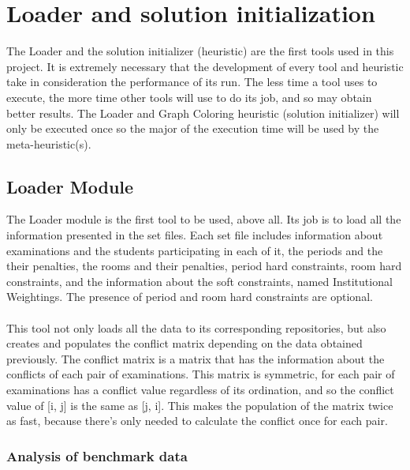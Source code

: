 \chapter{Loader and solution initialization}
\label{implementation}
\thispagestyle{plain}

The Loader and the solution initializer (heuristic) are the first tools used in this project. It is extremely necessary that the development of every tool and heuristic take in consideration the performance of its run. The less time a tool uses to execute, the more time other tools will use to do its job, and so may obtain better results. The Loader and Graph Coloring heuristic (solution initializer) will only be executed once so the major of the execution time will be used by the meta-heuristic(s).

\section{Loader Module}

The Loader module is the first tool to be used, above all. Its job is to load all the information presented in the set files. Each set file includes information about examinations and the students participating in each of it, the periods and the their penalties, the rooms and their penalties, period hard constraints, room hard constraints, and the information about the soft constraints, named Institutional Weightings. The presence of period and room hard constraints are optional.\\
\\
This tool not only loads all the data to its corresponding repositories, but also creates and populates the conflict matrix depending on the data obtained previously. The conflict matrix is a matrix that has the information about the conflicts of each pair of examinations. This matrix is symmetric, for each pair of examinations has a conflict value regardless of its ordination, and so the conflict value of [i, j] is the same as [j, i]. This makes the population of the matrix twice as fast, because there's only needed to calculate the conflict once for each pair.

\subsection{Analysis of benchmark data}

